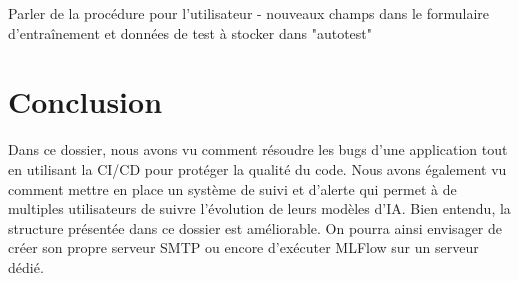 \documentclass[french]{article}
\begin{document}
    Parler de la procédure pour l'utilisateur - nouveaux champs dans le formulaire d'entraînement et données de test à stocker dans "autotest"
    
    \section{Conclusion}
    Dans ce dossier, nous avons vu comment résoudre les bugs d'une application tout en utilisant la CI/CD pour protéger la qualité du code. Nous avons également vu comment mettre en place un système de suivi et d'alerte qui permet à de multiples utilisateurs de suivre l'évolution de leurs modèles d'IA. Bien entendu, la structure présentée dans ce dossier est améliorable. On pourra ainsi envisager de créer son propre serveur SMTP ou encore d'exécuter MLFlow sur un serveur dédié.
\end{document}
